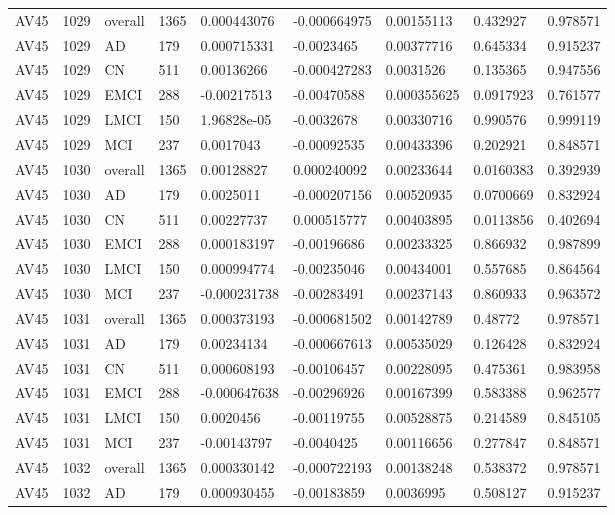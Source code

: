 \begin{landscape}
\begin{longtable}{lllllllll}
AV45 & 1029 & overall & 1365 & 0.000443076 & -0.000664975 & 0.00155113 & 0.432927 & 0.978571 \\
AV45 & 1029 & AD & 179 & 0.000715331 & -0.0023465 & 0.00377716 & 0.645334 & 0.915237 \\
AV45 & 1029 & CN & 511 & 0.00136266 & -0.000427283 & 0.0031526 & 0.135365 & 0.947556 \\
AV45 & 1029 & EMCI & 288 & -0.00217513 & -0.00470588 & 0.000355625 & 0.0917923 & 0.761577 \\
AV45 & 1029 & LMCI & 150 & 1.96828e-05 & -0.0032678 & 0.00330716 & 0.990576 & 0.999119 \\
AV45 & 1029 & MCI & 237 & 0.0017043 & -0.00092535 & 0.00433396 & 0.202921 & 0.848571 \\
AV45 & 1030 & overall & 1365 & 0.00128827 & 0.000240092 & 0.00233644 & 0.0160383 & 0.392939 \\
AV45 & 1030 & AD & 179 & 0.0025011 & -0.000207156 & 0.00520935 & 0.0700669 & 0.832924 \\
AV45 & 1030 & CN & 511 & 0.00227737 & 0.000515777 & 0.00403895 & 0.0113856 & 0.402694 \\
AV45 & 1030 & EMCI & 288 & 0.000183197 & -0.00196686 & 0.00233325 & 0.866932 & 0.987899 \\
AV45 & 1030 & LMCI & 150 & 0.000994774 & -0.00235046 & 0.00434001 & 0.557685 & 0.864564 \\
AV45 & 1030 & MCI & 237 & -0.000231738 & -0.00283491 & 0.00237143 & 0.860933 & 0.963572 \\
AV45 & 1031 & overall & 1365 & 0.000373193 & -0.000681502 & 0.00142789 & 0.48772 & 0.978571 \\
AV45 & 1031 & AD & 179 & 0.00234134 & -0.000667613 & 0.00535029 & 0.126428 & 0.832924 \\
AV45 & 1031 & CN & 511 & 0.000608193 & -0.00106457 & 0.00228095 & 0.475361 & 0.983958 \\
AV45 & 1031 & EMCI & 288 & -0.000647638 & -0.00296926 & 0.00167399 & 0.583388 & 0.962577 \\
AV45 & 1031 & LMCI & 150 & 0.0020456 & -0.00119755 & 0.00528875 & 0.214589 & 0.845105 \\
AV45 & 1031 & MCI & 237 & -0.00143797 & -0.0040425 & 0.00116656 & 0.277847 & 0.848571 \\
AV45 & 1032 & overall & 1365 & 0.000330142 & -0.000722193 & 0.00138248 & 0.538372 & 0.978571 \\
AV45 & 1032 & AD & 179 & 0.000930455 & -0.00183859 & 0.0036995 & 0.508127 & 0.915237 \\

\end{longtable}
\end{landscape}
